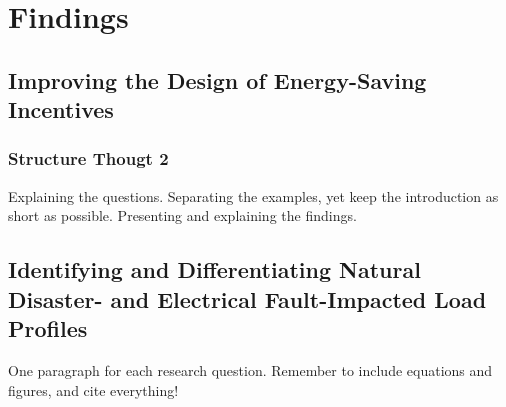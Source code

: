 \chapter{Findings}
\label{cha:findings}


\section{Improving the Design of Energy-Saving Incentives}
\label{sec:improving_the_design_of_energy_saving_incentives}
\subsection*{Structure Thougt 2}
Explaining the questions.
Separating the examples, yet keep the introduction as short as possible.
Presenting and explaining the findings.

\section{Identifying and Differentiating Natural Disaster- and Electrical Fault-Impacted Load Profiles}
\label{sec:identifying_and_differentiating_natural_disaster_and_electrical_fault_impacted_load_profiles}
One paragraph for each research question.
Remember to include equations and figures, and cite everything!